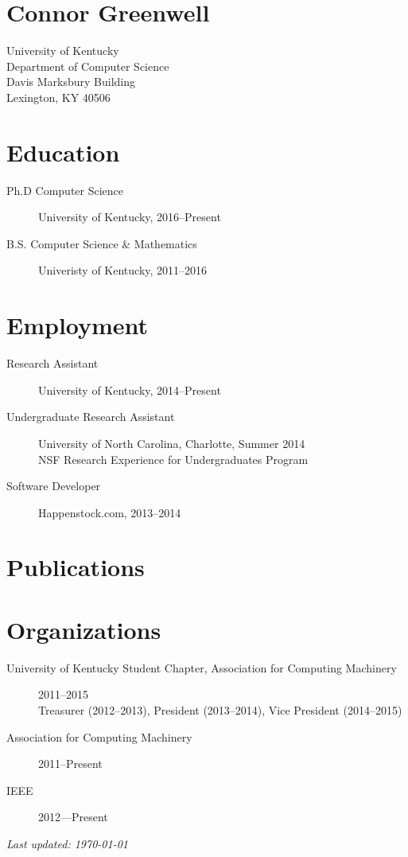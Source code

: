 \documentclass[12pt]{article}
\begin{document}
\section*{\bf\huge Connor Greenwell}

University of Kentucky\\
Department of Computer Science\\
Davis Marksbury Building\\
Lexington, KY 40506

\section*{Education}

\begin{description}
    \item[Ph.D Computer Science]
        University of Kentucky, 2016--Present
    \item[B.S. Computer Science \& Mathematics]
        Univeristy of Kentucky, 2011--2016
\end{description}

\section*{Employment}

\begin{description}
    \item[Research Assistant]
        University of Kentucky, 2014--Present
    \item[Undergraduate Research Assistant]
        University of North Carolina, Charlotte, Summer 2014\\
        NSF Research Experience for Undergraduates Program
    \item[Software Developer]
        Happenstock.com, 2013--2014
\end{description}

\section*{Publications}

\nocite{*}
\printbibliography[heading=none]

\section*{Organizations}

\begin{description}
    \item[University of Kentucky Student Chapter, 
        Association for Computing Machinery] 
        2011--2015\\
        Treasurer (2012--2013), President (2013--2014), Vice President
        (2014--2015)
    \item[Association for Computing Machinery] 2011--Present
    \item[IEEE] 2012---Present
\end{description}

\vspace{\fill}
{\centering
    \small\emph{Last updated: \today}\par
}
\end{document}
